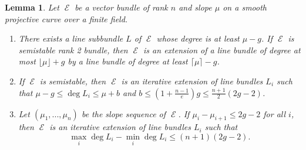 \documentclass[11pt]{amsart}
\newtheorem{lem}[thm]{Lemma}
\theoremstyle{definition}
\theoremstyle{remark}
\DeclareMathOperator{\E}{\mathcal{E}}
\numberwithin{equation}{section}
\begin{document}
\begin{lem}\label{semistable bound}
    Let $\E$ be a  vector bundle of rank $n$ and slope $\mu$ on a smooth projective curve over a finite field. 
    \begin{enumerate}
        \item There exists a line subbundle $L$ of $\E$ whose degree is at least $\mu-g$. If $\E$ is semistable rank 2 bundle, then $\E$ is an extension of a line bundle of degree at most $\lfloor \mu \rfloor +g$ by a line bundle of degree at least $\lceil \mu \rceil -g$.
        \item If $\E$ is semistable, then $\E$ is an iterative extension of line bundles $L_i$ such that $ \mu-g\leq \deg L_i  \leq \mu+b$ and $b\leq (1+\frac{n-1}{e})g \leq \frac{n+1}{2}(2g-2)$.
        \item Let $(\mu_1,...,\mu_n)$ be the slope sequence of $\E$. If $\mu_i-\mu_{i+1}\leq 2g-2$ for all $i$, then $\E$ is an iterative extension of line bundles $L_i$ such that  $$\max_i{ \deg L_i} - \min_i{ \deg L_i }\leq (n+1)(2g-2).$$
    \end{enumerate}

\end{lem}
\end{document}
